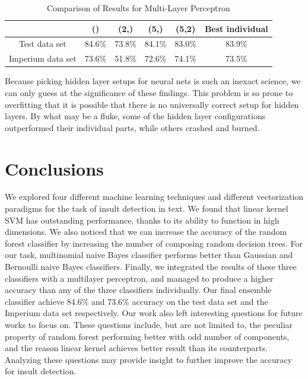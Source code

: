 \documentclass[11pt]{article}
\begin{document}
\begin{table}[h]
    \centering
     \begin{tabular}{|c| c c c c c|} 
     \hline
      & () & (2,) & (5,) & (5,2) & Best individual\\ [0.5ex] 
     \hline
      Test data set & 84.6\% & 73.8\% & 84.1\% & 83.0\% & 83.9\% \\ 
     \hline
      Imperium data set & 73.6\% & 51.8\% & 72.6\% & 74.1\% & 73.5\% \\ 
     \hline
    \end{tabular}
    \caption{Comparison of Results for Multi-Layer Perceptron}
\end{table}

Because picking hidden layer setups for neural nets is such an inexact science,
we can only guess at the significance of these findings. This problem is so
prone to overfitting that it is possible that there is no universally correct
setup for hidden layers. By what may be a fluke, some of the hidden layer
configurations outperformed their individual parts, while others crashed and
burned.

\section{Conclusions}

We explored four different machine learning techniques and different
vectorization paradigms for the task of insult detection in text. We found that
linear kernel SVM has outstanding performance, thanks to its ability to
function in high dimensions. We also noticed that we can increase the accuracy
of the random forest classifier by increasing the number of composing random
decision trees. For our task, multinomial naive Bayes classifier performs
better than Gaussian and Bernoulli naive Bayes classifiers. Finally, we
integrated the results of these three classifiers with a multilayer perceptron,
and managed to produce a higher accuracy than any of the three classifiers
individually. Our final ensemble classifier achieve 84.6\% and 73.6\% accuracy
on the test data set and the Imperium data set respectively. Our work also left
interesting questions for future works to focus on. These questions include,
but are not limited to, the peculiar property of random forest performing
better with odd number of components, and the reason linear kernel achieves
better result than its counterparts. Analyzing these questions may provide
insight to further improve the accuracy for insult detection.
\end{document}
